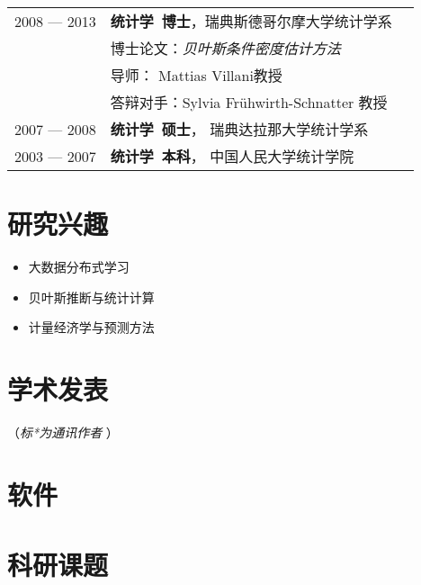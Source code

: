 \documentclass[twoside,a4paper,10pt]{amsart}
\begin{document}
\begin{tabular}{ l  p{} l}
  2008 --- 2013 &\textbf{统计学~博士}，瑞典斯德哥尔摩大学统计学系\\
  & 博士论文：\emph{贝叶斯条件密度估计方法}\\
  & 导师： Mattias Villani教授\\
  & 答辩对手：Sylvia Frühwirth-Schnatter 教授\\

  2007 --- 2008 & \textbf{统计学~硕士}， 瑞典达拉那大学统计学系\\

  2003 --- 2007 & \textbf{统计学~本科}， 中国人民大学统计学院\\
\end{tabular}

\section*{研究兴趣}

\begin{itemize}
\item 大数据分布式学习
\item 贝叶斯推断与统计计算
\item 计量经济学与预测方法

\end{itemize}

\section*{学术发表}
（\emph{标*为通讯作者} ）
\nocite{zhu2021least}
\nocite{wang2021uncertainty_jors}
\nocite{kang2021deja_jbr}
\nocite{hao2020bilinear}
\nocite{li2020forecasting}
\nocite{kang2020gratis_sam}
\nocite{li2020fppcn}
\nocite{kalesan2020intersections}
\nocite{bailey2019changes}
\nocite{li2019credit}
\nocite{li2018improving_ijf}
\nocite{pino2018cohort}
\nocite{li2016distributedcn}
\nocite{li2013bayesian}
\nocite{li2013efficient_sjs}
\nocite{li2011modeling}
\nocite{li2010flexible_jspi}
\printbibliography[heading=none, nottype=software]

\section*{软件}
\nocite{gratis}
\nocite{spark-dlsa}
\printbibliography[heading=none, type=software]

\section*{科研课题}
\end{document}

